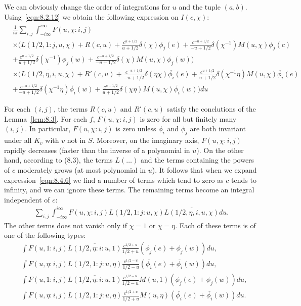 We can obviously change the order of integrations for $u$ and the tuple $(a, b)$.
Using~\eqref{eqn:8.2.12} we obtain the following expression on $I(c, \chi)$:
\begin{equation}
\label{eqn:8.4.6}
\begin{aligned}
    &\frac{1}{i\pi} \sum_{i, j} \int_{-i\infty}^{i\infty} F(u, \chi: i, j) \\
    &\times \bigg( L(1/2, 1:j, u, \chi) + R(c, u) 
    + \frac{c^{u+ 1/2}}{u + 1/2}\delta(\chi)\phi_j(e)
    + \frac{c^{-u+1/2}}{-u+1/2}\delta(\chi^{-1})M(u, \chi)\phi_j(c) \\
    &+ \frac{c^{u+1/2}}{u + 1/2} \delta(\chi^{-1}) \phi_j(w) + \frac{c^{-u+1/2}}{-u+1/2} \delta(\chi) M(u, \chi) \phi_j(w) \bigg) \\
    &\times \bigg( \overline{L(1/2, \eta, i, u, \chi)} + R'(c, u) 
    + \frac{c^{-u+1/2}}{-u+1/2} \delta(\eta \chi)\overline{\phi_i}(e) 
    + \frac{c^{u+1/2}}{u + 1/2} \delta(\chi^{-1}\eta) M(u, \chi) \overline{\phi_i}(e) \\
    &+ \frac{c^{-u+1/2}}{-u+1/2}\delta(\chi^{-1}\eta)\overline{\phi_i}(w) + \frac{c^{u+1/2}}{u+1/2} \delta(\chi\eta) M(u, \chi)\overline{\phi_i}(w)\bigg) du
\end{aligned}
\end{equation}

For each $(i, j)$, the terms $R(c, u)$ and $R'(c, u)$ satisfy the conclutions of the Lemma~\ref{lem:8.3}.
For each $f$,  $F(u, \chi: i, j)$ is zero for all but finitely many $(i, j)$. 
In particular, $F(u, \chi: i, j)$ is zero unless $\phi_i$ and $\phi_j$ are both invariant under all $K_v$ with $v$ not in $S $.
Moreover, on the imaginary axis, $F(u, \chi: i, j)$ rapidly decreases (faster than the inverse of a polynomial in $u$).
On the other hand, according to (8.3), the terms $L(\dots)$ and the terms containing the powers of $c$ moderately grows (at most polynomial in $u$).
It follows that when we expand expression~\eqref{eqn:8.4.6} we find a number of terms which tend to zero as $c$ tends to infinity, and we can ignore these terms.
The remaining terms become an  integral independent of $c$:
\begin{align}
    \label{eqn:8.4.7}
    \sum_{i, j}\int_{-i\infty}^{i\infty} F(u, \chi: i, j) L(1/2, 1:j:u, \chi) \overline{L(1/2, \eta, i, u, \chi)} du.
\end{align}
The other terms does not vanish only if $\chi=1$ or $\chi=\eta$.
Each of these terms is of one of the following types:
\begin{align}
    &\int F(u,1:i, j)\overline{L(1/2, \eta:i:u, 1)} \frac{c^{1/2+u}}{1/2+u}(\phi_j(e) + \phi_j(w))du, \label{eqn:8.4.8} \\
    &\int F(u, \eta:i, j) L(1/2, 1: j: u, \eta) \frac{c^{1/2-u}}{1/2-u} (\overline{\phi_i}(e) + \overline{\phi_i}(w)) du, \label{eqn:8.4.9} \\
    &\int F(u, 1:i, j) \overline{L(1/2, \eta:i:u, 1)} \frac{c^{1/2-u}}{1/2-u} M(u, 1)(\phi_j(e) +\phi_j(w)) du, \label{eqn:8.4.10}\\
    &\int F(u, \eta:i, j)L(1/2, 1:j:u, \eta) \frac{c^{1/2+u}}{1/2+u} M(u, \eta)(\overline{\phi_i}(e) +\overline{\phi_i}(w)) du. \label{eqn:8.4.11}
\end{align}

